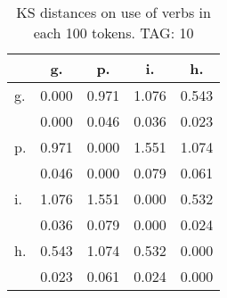 \begin{table}[h!]
\begin{center}
\begin{tabular}{| l | c | c | c | c |}\hline
 & g. & p. & i. & h. \\\hline
g. & 0.000  & 0.971  & 1.076  & 0.543 \\\hline
 & 0.000  & 0.046  & 0.036  & 0.023 \\\hline
p. & 0.971  & 0.000  & 1.551  & 1.074 \\\hline
 & 0.046  & 0.000  & 0.079  & 0.061 \\\hline
i. & 1.076  & 1.551  & 0.000  & 0.532 \\\hline
 & 0.036  & 0.079  & 0.000  & 0.024 \\\hline
h. & 0.543  & 1.074  & 0.532  & 0.000 \\\hline
 & 0.023  & 0.061  & 0.024  & 0.000 \\\hline
\end{tabular}
\caption{KS distances on use of verbs in each 100 tokens. TAG: 10}
\end{center}
\end{table}